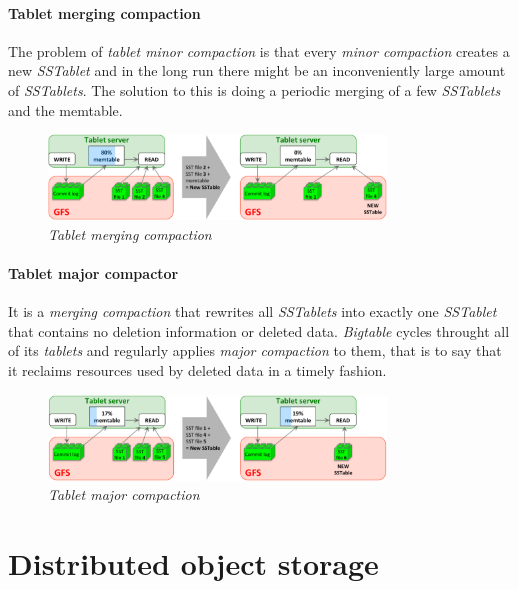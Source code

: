 \paragraph{Tablet merging compaction}
The problem of \emph{tablet minor compaction} is that every \emph{minor
compaction} creates a new \emph{SSTablet} and in the long run there might be
an inconveniently large amount of \emph{SSTablets}. The solution to this is
doing a periodic merging of a few \emph{SSTablets} and the memtable.

\begin{figure}[ht!]
    \centering
    \includegraphics[width=0.8\textwidth]{images/gbt-tablet-merge-comp.png}
    \caption{\emph{Tablet merging compaction}}
\end{figure}

\paragraph{Tablet major compactor}
It is a \emph{merging compaction} that rewrites all \emph{SSTablets} into
exactly one \emph{SSTablet} that contains no deletion information or deleted
data. \emph{Bigtable} cycles throught all of its \emph{tablets} and regularly
applies \emph{major compaction} to them, that is to say that it reclaims
resources used by deleted data in a timely fashion.

\begin{figure}[h!]
    \centering
    \includegraphics[width=0.8\textwidth]{images/gbt-tablet-major-comp.png}
    \caption{\emph{Tablet major compaction}}
\end{figure}

\section{Distributed object storage}